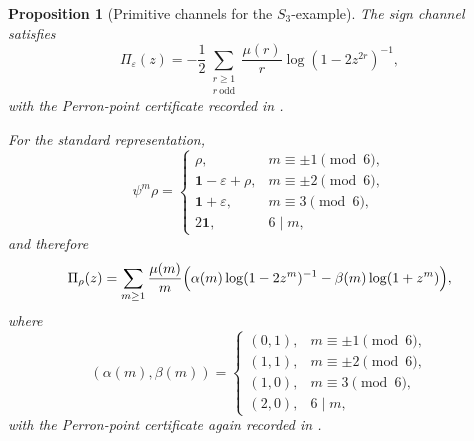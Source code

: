 \documentclass[11pt,a4paper]{amsart}
\theoremstyle{plain}
\newtheorem{proposition}[theorem]{Proposition}
\theoremstyle{definition}
\theoremstyle{remark}
\begin{document}
\begin{proposition}[Primitive channels for the \(S_3\)-example]
  \label{prop:s3-example-primitive-channels}
  The sign channel satisfies
  \begin{equation}\label{eq:s3-example-pi-eps}
    \Pi_\varepsilon(z)
    =
    -\frac12
      \sum_{\substack{r\ge 1\\ r\ \mathrm{odd}}}
        \frac{\mu(r)}{r}\log(1-2z^{2r})^{-1},
  \end{equation}
  with the Perron-point certificate recorded in
  .

  For the standard representation,
  \begin{equation}\label{eq:s3-example-adams-rho}
    \psi^m\rho=
    \begin{cases}
      \rho, & m\equiv \pm 1 \pmod 6, \\
      \mathbf 1-\varepsilon+\rho, & m\equiv \pm 2 \pmod 6, \\
      \mathbf 1+\varepsilon, & m\equiv 3 \pmod 6, \\
      2\mathbf 1, & 6\mid m,
    \end{cases}
  \end{equation}
  and therefore
  \begin{equation}\label{eq:s3-example-pi-rho}
    \Pi_\rho(z)
    =
    \sum_{m\ge 1}\frac{\mu(m)}{m}
      \Bigl(
        \alpha(m)\log(1-2z^m)^{-1}
        -\beta(m)\log(1+z^m)
      \Bigr),
  \end{equation}
  where
  \begin{equation}\label{eq:s3-example-alpha-beta}
    (\alpha(m),\beta(m))=
    \begin{cases}
      (0,1), & m\equiv \pm 1 \pmod 6, \\
      (1,1), & m\equiv \pm 2 \pmod 6, \\
      (1,0), & m\equiv 3 \pmod 6, \\
      (2,0), & 6\mid m,
    \end{cases}
  \end{equation}
  with the Perron-point certificate again recorded in
  .
\end{proposition}
\end{document}
